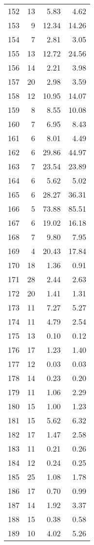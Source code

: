 \begin{longtable}{c r r r}
  152 & 13  & 5.83 & 4.62 \\ 
  153 & 9  & 12.34 & 14.26 \\ 
  154 & 7  & 2.81 & 3.05 \\ 
  155 & 13  & 12.72 & 24.56 \\ 
  156 & 14  & 2.21 & 3.98 \\ 
  157 & 20  & 2.98 & 3.59 \\ 
  158 & 12  & 10.95 & 14.07 \\ 
  159 & 8  & 8.55 & 10.08 \\ 
  160 & 7  & 6.95 & 8.43 \\ 
  161 & 6  & 8.01 & 4.49 \\ 
  162 & 6  & 29.86 & 44.97 \\ 
  163 & 7  & 23.54 & 23.89 \\ 
  164 & 6  & 5.62 & 5.02 \\ 
  165 & 6  & 28.27 & 36.31 \\ 
  166 & 5  & 73.88 & 85.51 \\ 
  167 & 6  & 19.02 & 16.18 \\ 
  168 & 7  & 9.80 & 7.95 \\ 
  169 & 4  & 20.43 & 17.84 \\ 
  170 & 18  & 1.36 & 0.91 \\ 
  171 & 28  & 2.44 & 2.63 \\ 
  172 & 20  & 1.41 & 1.31 \\ 
  173 & 11  & 7.27 & 5.27 \\ 
  174 & 11  & 4.79 & 2.54 \\ 
  175 & 13  & 0.10 & 0.12 \\ 
  176 & 17  & 1.23 & 1.40 \\ 
  177 & 12  & 0.03 & 0.03 \\ 
  178 & 14  & 0.23 & 0.20 \\ 
  179 & 11  & 1.06 & 2.29 \\ 
  180 & 15  & 1.00 & 1.23 \\ 
  181 & 15  & 5.62 & 6.32 \\ 
  182 & 17  & 1.47 & 2.58 \\ 
  183 & 11  & 0.21 & 0.26 \\ 
  184 & 12  & 0.24 & 0.25 \\ 
  185 & 25  & 1.08 & 1.78 \\ 
  186 & 17  & 0.70 & 0.99 \\ 
  187 & 14  & 1.92 & 3.37 \\ 
  188 & 15  & 0.38 & 0.58 \\ 
  189 & 10  & 4.02 & 5.26 \\ 

\end{longtable}
